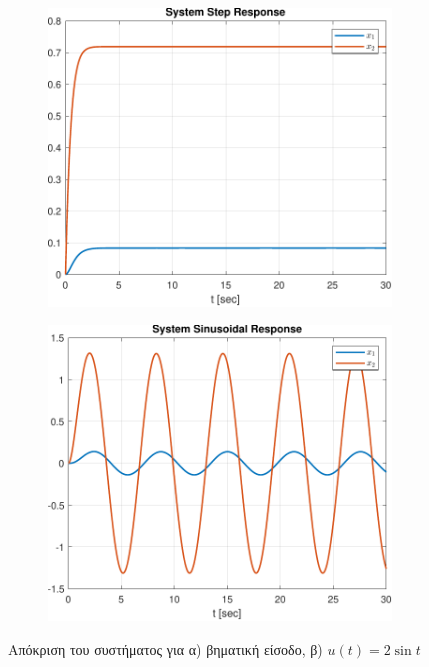 \documentclass[a4paper,12pt]{article}
\begin{document}
\begin{figure}[htbp]
  \centering
  \begin{subfigure}[b]{0.45\textwidth}
    \centering
    \includegraphics[width=\textwidth]{plot/task1_step_response.pdf}
    \caption{}
    \label{fig:task1_step_response}
  \end{subfigure}
  \hfill
  \begin{subfigure}[b]{0.45\textwidth}
    \centering
    \includegraphics[width=\textwidth]{plot/task1_sinusoidal_response.pdf}
    \caption{}
    \label{fig:task1_sinusoidal_response}
  \end{subfigure}
  \caption{Απόκριση του συστήματος για α) βηματική είσοδο, β) $u(t) = 2 \sin t$}
  \label{fig:task1_response}
\end{figure}
\end{document}
